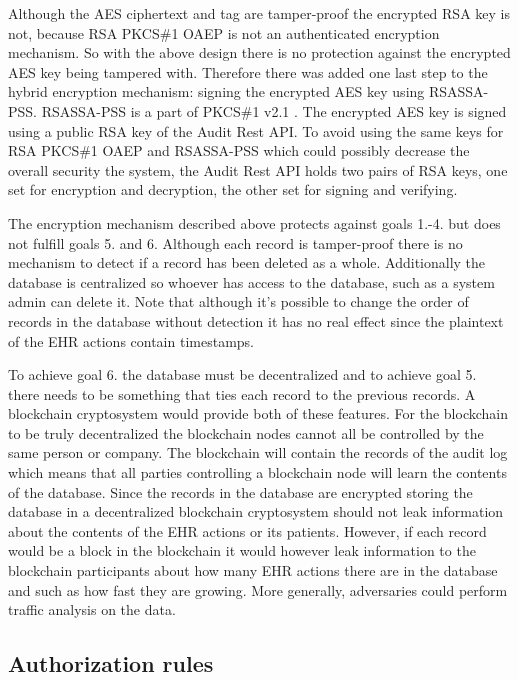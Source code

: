 \documentclass[11pt]{article}
\begin{document}
\begin{flushleft}
Although the AES ciphertext and tag are tamper-proof the encrypted RSA key is not, because RSA PKCS\#1 OAEP is not an authenticated encryption mechanism. So with the above design there is no protection against the encrypted AES key being tampered with. Therefore there was added one last step to the hybrid encryption mechanism: signing the encrypted AES key using RSASSA-PSS. RSASSA-PSS is a part of PKCS\#1 v2.1 \cite{pkcs1}. The encrypted AES key is signed using a public RSA key of the Audit Rest API. To avoid using the same keys for RSA PKCS\#1 OAEP and RSASSA-PSS which could possibly decrease the overall security the system, the Audit Rest API holds two pairs of RSA keys, one set for encryption and decryption, the other set for signing and verifying.

The encryption mechanism described above protects against goals 1.-4. but does not fulfill goals 5. and 6. Although each record is tamper-proof there is no mechanism to detect if a record has been deleted as a whole. Additionally the database is centralized so whoever has access to the database, such as a system admin can delete it. Note that although it's possible to change the order of records in the database without detection it has no real effect since the plaintext of the EHR actions contain timestamps.

To achieve goal 6. the database must be decentralized and to achieve goal 5. there needs to be something that ties each record to the previous records. A blockchain cryptosystem would provide both of these features. For the blockchain to be truly decentralized the blockchain nodes cannot all be controlled by the same person or company. The blockchain will contain the records of the audit log which means that all parties controlling a blockchain node will learn the contents of the database. Since the records in the database are encrypted storing the database in a decentralized blockchain cryptosystem should not leak information about the contents of the EHR actions or its patients. However, if each record would be a block in the blockchain it would however leak information to the blockchain participants about how many EHR actions there are in the database and such as how fast they are growing. More generally, adversaries could perform traffic analysis on the data.

\subsection{Authorization rules}


\end{flushleft}
\end{document}
